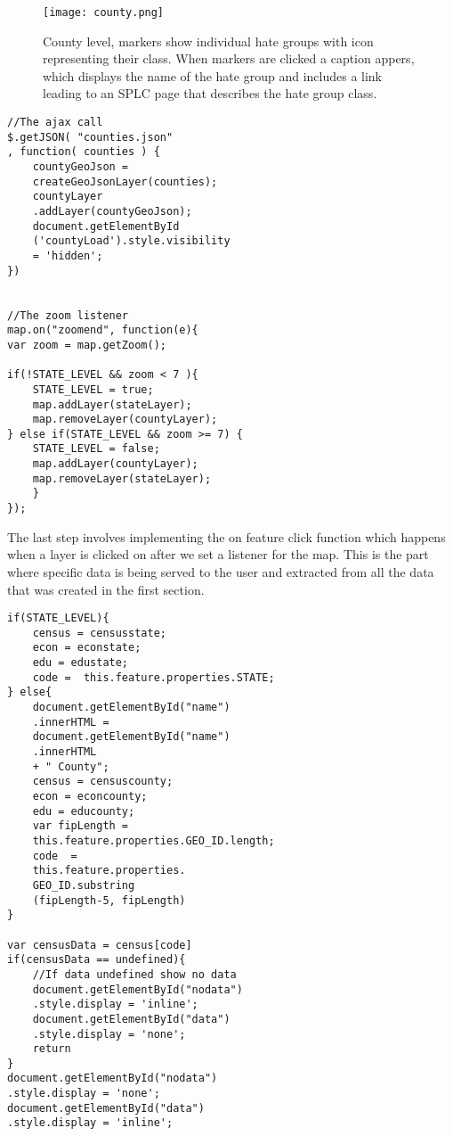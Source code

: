 \documentclass[twoside]{article}
\begin{document}
\begin{multicols}{2}
\begin{figure*} %
\texttt{[image: county.png]}
\caption 
{County level, markers show individual hate groups with icon representing their class. When markers are clicked a caption appers, which displays the name of the hate group and includes a link leading to an SPLC page that describes the hate group class.} 
\end{figure*}

\begin{verbatim}
//The ajax call
$.getJSON( "counties.json"
, function( counties ) {
    countyGeoJson = 
    createGeoJsonLayer(counties);
    countyLayer
    .addLayer(countyGeoJson);
    document.getElementById
    ('countyLoad').style.visibility 
    = 'hidden';
})


//The zoom listener
map.on("zoomend", function(e){
var zoom = map.getZoom();

if(!STATE_LEVEL && zoom < 7 ){
    STATE_LEVEL = true;
    map.addLayer(stateLayer);
    map.removeLayer(countyLayer);
} else if(STATE_LEVEL && zoom >= 7) {
    STATE_LEVEL = false;
    map.addLayer(countyLayer);
    map.removeLayer(stateLayer);
    }
});
\end{verbatim}
The last step involves implementing the on feature click function which happens when a layer is clicked on after we set a listener for the map.
This is the part where specific data is being served to the user and extracted from all the data that was created in the first section.
\begin{verbatim}
if(STATE_LEVEL){
    census = censusstate;
    econ = econstate;
    edu = edustate;
    code =  this.feature.properties.STATE;
} else{
    document.getElementById("name")
    .innerHTML =     
    document.getElementById("name")
    .innerHTML 
    + " County";
    census = censuscounty;
    econ = econcounty;
    edu = educounty;
    var fipLength = 
    this.feature.properties.GEO_ID.length;
    code  =  
    this.feature.properties.
    GEO_ID.substring
    (fipLength-5, fipLength)
}

var censusData = census[code]
if(censusData == undefined){
    //If data undefined show no data
    document.getElementById("nodata")
    .style.display = 'inline'; 
    document.getElementById("data")
    .style.display = 'none'; 
    return
} 
document.getElementById("nodata")
.style.display = 'none'; 
document.getElementById("data")
.style.display = 'inline'; 


\end{verbatim}
\end{multicols}
\end{document}
